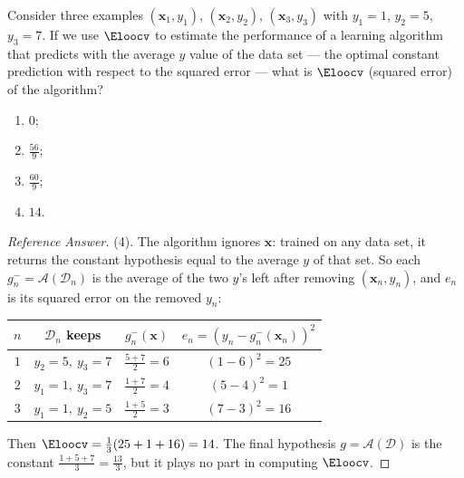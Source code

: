 \begin{exercise}
    Consider three examples \((\bm{x}_1, y_1)\), \((\bm{x}_2, y_2)\),
    \((\bm{x}_3, y_3)\) with \(y_1 = 1\), \(y_2 = 5\), \(y_3 = 7\). If we use
    \(\Eloocv\) to estimate the performance of a learning algorithm that
    predicts with the average \(y\) value of the data set --- the optimal
    constant prediction with respect to the squared error --- what is
    \(\Eloocv\) (squared error) of the algorithm?
    \begin{enumerate}[(1)]
        \item \(0\);
        \item \(\frac{56}{9}\);
        \item \(\frac{60}{9}\);
        \item \(14\).
    \end{enumerate}
\end{exercise}

\begin{proof}[Reference Answer]
    (4). The algorithm ignores \(\bm{x}\): trained on any data set, it returns
    the constant hypothesis equal to the average \(y\) of that set. So each
    \(g_n^- = \mathcal{A}(\mathcal{D}_n)\) is the average of the two \(y\)'s
    left after removing \((\bm{x}_n, y_n)\), and \(e_n\) is its squared error on
    the removed \(y_n\):
    \begin{center}
        \solidrules
        \begin{tabular}{c|c|c|c}
            \toprule
            \(n\) & \(\mathcal{D}_n\) keeps & \(g_n^-(\bm{x})\) &
            \(e_n = (y_n - g_n^-(\bm{x}_n))^2\) \\
            \midrule
            \(1\) & \(y_2 = 5,\ y_3 = 7\) & \(\frac{5 + 7}{2} = 6\) &
            \((1 - 6)^2 = 25\) \\
            \(2\) & \(y_1 = 1,\ y_3 = 7\) & \(\frac{1 + 7}{2} = 4\) &
            \((5 - 4)^2 = 1\) \\
            \(3\) & \(y_1 = 1,\ y_2 = 5\) & \(\frac{1 + 5}{2} = 3\) &
            \((7 - 3)^2 = 16\) \\
            \bottomrule
        \end{tabular}
    \end{center}
    Then \(\Eloocv = \frac{1}{3}(25 + 1 + 16) = 14\). The final hypothesis
    \(g = \mathcal{A}(\mathcal{D})\) is the constant \(\frac{1 + 5 + 7}{3} =
    \frac{13}{3}\), but it plays no part in computing \(\Eloocv\).
\end{proof}

